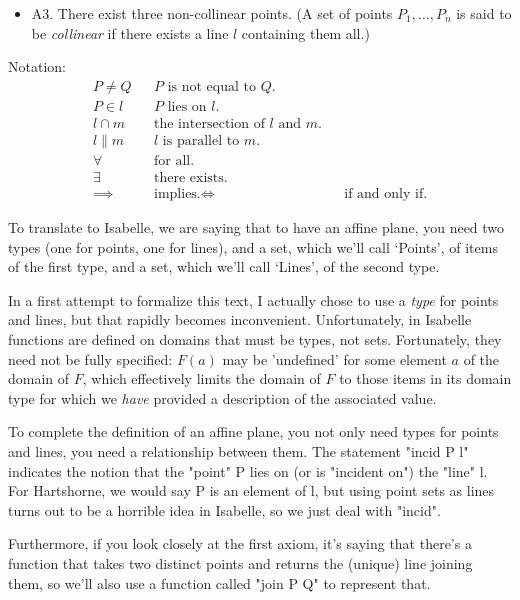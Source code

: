 \begin{isabellebody}
\begin{isamarkuptext}
\begin{hartshorne}
\begin{itemize}
\item{A3.} There exist three non-collinear points. (A set of points $P_1, \ldots, P_n$ is said to be 
\emph{collinear} if there exists a line $l$ containing them all.)
\end{itemize}

Notation: 
\begin{align}
P \ne Q && \text{$P$ is not equal to $Q$.} \\
P \in l && \text{$P$ lies on $l$.}\\
l \cap m && \text{the intersection of $l$ and $m$.}\\
l \parallel m && \text{$l$ is parallel to  $m$.}\\
\forall && \text{for all.}\\
\exists && \text{there exists.}\\
\implies && \text{implies.}
\iff && \text{if and only if.}
\end{align}
\end{hartshorne}%
\end{isamarkuptext}\isamarkuptrue%
%
\begin{isamarkuptext}%
\spike
To translate to Isabelle, we are saying that to have an affine plane, you need two types (one for points, 
one for lines), and a set, which we'll call `Points', of items of the first type, and a set, which we'll call 
`Lines', of the second type. 

In a first attempt to formalize this text, I actually chose to use a \emph{type} for points and lines, but that rapidly becomes
inconvenient. Unfortunately, in Isabelle functions are defined on domains that must be types, 
not sets. Fortunately, they need not be fully specified:  $F(a)$ may be 'undefined' for
 some element $a$ of the domain of $F$, which effectively limits the domain of $F$ to those 
items in its domain type for which we \emph{have} provided a description of the associated value. 

To complete the definition of an affine plane, you not only need types for points and lines, you 
need a relationship between them. The statement "incid P l" indicates the notion
that the "point" P lies on (or is "incident on") the "line" l. For Hartshorne, we would say P 
is an element of l, but using
point sets as lines turns out to be a horrible idea in Isabelle, so we just deal with "incid".

Furthermore, if you look closely at the first axiom, it's saying that there's a function that takes two distinct 
points and returns the (unique) line joining them, so we'll also use a function called "join P Q" to represent that. 


\end{isamarkuptext}
\end{isabellebody}

